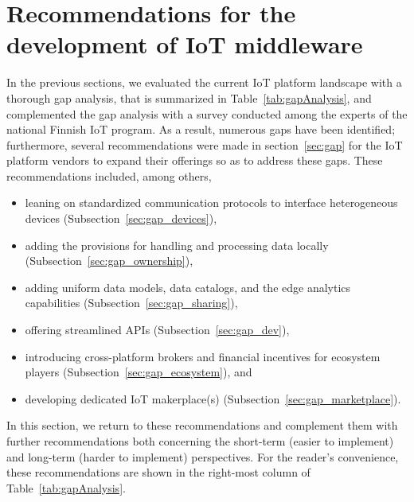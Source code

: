 \documentclass[preprint,10pt,5p]{elsarticle}
\begin{document}
\section{Recommendations for the development of IoT middleware}
\label{sec:recommendations}

In the previous sections, we evaluated the current IoT platform landscape with a
thorough gap analysis, that is summarized in
Table~\ref{tab:gapAnalysis}, and complemented the gap analysis with a
survey conducted among the experts of the national Finnish IoT program.
As a result, numerous gaps have been identified; 
furthermore, several recommendations were made in section~\ref{sec:gap} 
for the IoT platform vendors to expand their offerings so as to address these gaps. 
These recommendations included, among others, 
\begin{itemize}
\item leaning on standardized communication protocols to interface heterogeneous devices (Subsection~\ref{sec:gap_devices}),
\item adding the provisions for handling and processing data locally (Subsection~\ref{sec:gap_ownership}),
\item adding uniform data models, data catalogs, and the edge analytics capabilities (Subsection~\ref{sec:gap_sharing}),
\item offering streamlined APIs (Subsection~\ref{sec:gap_dev}), 
\item introducing cross-platform brokers and financial incentives for ecosystem players (Subsection~\ref{sec:gap_ecosystem}), and 
\item developing dedicated IoT makerplace(s) (Subsection~\ref{sec:gap_marketplace}). 
\end{itemize}

In this section, we return to these recommendations and complement them with further recommendations 
both concerning the short-term (easier to implement) and long-term (harder to implement) perspectives.
For the reader's convenience, these recommendations are shown in the right-most column of 
Table~\ref{tab:gapAnalysis}.
\end{document}
